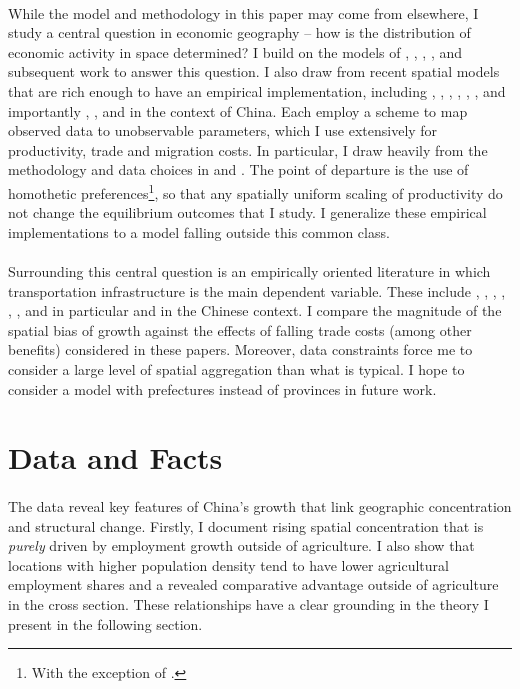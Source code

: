 \documentclass[]{article}
\theoremstyle{plain}
\begin{document}
\paragraph*{}
While the model and methodology in this paper may come from elsewhere, I study a central question in economic geography -- how is the distribution of economic activity in space determined? I build on the models of \citet{krugman1991}, \citet{PUGA1999}, \citet{aggtraderev}, \citet{MURATA2008}, \citet{donalddavishme} and subsequent work to answer this question. I also draw from recent spatial models that are rich enough to have an empirical implementation, including \citet{allenarkolakis}, \citet{redding2016}, \citet{nagyhinterlands}, \citet{pathdep}, \citet{geodev}, \citet{sotello2020}, \cite{eckertpeters} and importantly \citet{tombezhu}, \citet{hao2020}, \citet{MA2020} and \cite{Fan2019} in the context of China. Each employ a scheme to map observed data to unobservable parameters, which I use extensively for productivity, trade and migration costs. In particular, I draw heavily from the methodology and data choices in \citet{tombezhu} and \citet{hao2020}. The point of departure is the use of homothetic preferences\footnote{With the exception of \cite{hao2020}.}, so that any spatially uniform scaling of productivity do not change the equilibrium outcomes that I study. I generalize these empirical implementations to a model falling outside this common class.  
\paragraph*{}
Surrounding this central question is an empirically oriented literature in which transportation infrastructure is the main dependent variable. These include \citet{baumsnow2007}, \citet{durturner}, \citet{durturnerurb}, \citet{bs2020}, \citet{herzog2021}, \citet{faberb}, \citet{bart2018} and in particular \cite{bsetal2017} and \cite{bsetal2020} in the Chinese context. I compare the magnitude of the spatial bias of growth against the effects of falling trade costs (among other benefits) considered in these papers. Moreover, data constraints force me to consider a large level of spatial aggregation than what is typical. I hope to consider a model with prefectures instead of provinces in future work.   

\section{Data and Facts}\label{section:datafacts}
\paragraph*{}
 The data reveal key features of China's growth that link geographic concentration and structural change. Firstly, I document rising spatial concentration that is \textit{purely} driven by employment growth outside of agriculture. I also show that locations with higher population density tend to have lower agricultural employment shares and a revealed comparative advantage outside of agriculture in the cross section. These relationships have a clear grounding in the theory I present in the following section.
\end{document}

